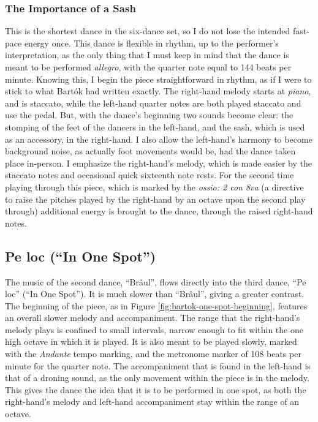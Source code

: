 \subsubsection{The Importance of a Sash}

This is the shortest dance in the six-dance set, so I do not lose the intended fast-pace energy once. This dance is flexible in rhythm, up to the performer's interpretation, as the only thing that I must keep in mind that the dance is meant to be performed \textit{allegro}, with the quarter note equal to 144 beats per minute. Knowing this, I begin the piece straightforward in rhythm, as if I were to stick to what Bartók had written exactly. The right-hand melody starts at \textit{piano}, and is staccato, while the left-hand quarter notes are both played staccato and use the pedal. But, with the dance's beginning two sounds become clear: the stomping of the feet of the dancers in the left-hand, and the sash, which is used as an accessory, in the right-hand. I also allow the left-hand's harmony to become background noise, as actually foot movements would be, had the dance taken place in-person. I emphasize the right-hand's melody, which is made easier by the staccato notes and occasional quick sixteenth note rests. For the second time playing through this piece, which is marked by the \textit{ossio: 2 con 8va} (a directive to raise the pitches played by the right-hand by an octave upon the second play through) additional energy is brought to the dance, through the raised right-hand notes. 


\subsection{Pe loc (``In One Spot'')}

The music of the second dance, ``Brâul'', flows directly into the third dance, ``Pe loc'' (``In One Spot''). It is much slower than ``Brâul'', giving a greater contrast. The beginning of the piece, as in Figure \ref{fig:bartok-one-spot-beginning}\autocite{Lung_2016}, features an overall slower melody and accompaniment. The range that the right-hand's melody plays is confined to small intervals, narrow enough to fit within the one high octave in which it is played. It is also meant to be played slowly, marked with the \textit{Andante} tempo marking, and the metronome marker of 108 beats per minute for the quarter note. The accompaniment that is found in the left-hand is that of a droning sound, as the only movement within the piece is in the melody. This gives the dance the idea that it is to be performed in one spot, as both the right-hand's melody and left-hand accompaniment stay within the range of an octave.


